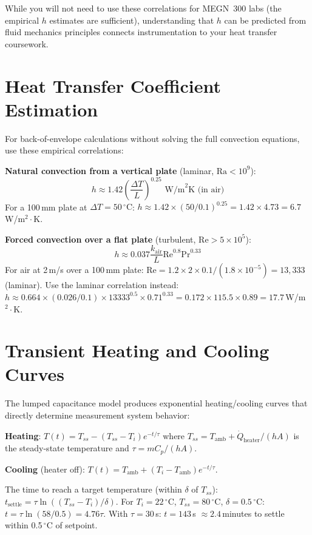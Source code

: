 \documentclass[11pt,letterpaper,twoside,openany]{book}
\newcommand{\degC}{\ensuremath{{}^{\circ}\text{C}}}
\begin{document}
While you will not need to use these correlations for MEGN~300 labs (the empirical $h$ estimates are sufficient), understanding that $h$ can be predicted from fluid mechanics principles connects instrumentation to your heat transfer coursework.
\section{Heat Transfer Coefficient Estimation}
For back-of-envelope calculations without solving the full convection equations, use these empirical correlations:

\textbf{Natural convection from a vertical plate} (laminar, $\text{Ra} < 10^9$):
\begin{equation}
h \approx 1.42 \left(\frac{\Delta T}{L}\right)^{0.25} \text{ W/m}^2\text{K (in air)}
\end{equation}
For a 100\,mm plate at $\Delta T = 50$\,\degC{}: $h \approx 1.42 \times (50/0.1)^{0.25} = 1.42 \times 4.73 = 6.7$\,W/m$^2\cdot$K.

\textbf{Forced convection over a flat plate} (turbulent, $\text{Re} > 5 \times 10^5$):
\begin{equation}
h \approx 0.037 \frac{k_{\text{air}}}{L} \text{Re}^{0.8} \text{Pr}^{0.33}
\end{equation}
For air at 2\,m/s over a 100\,mm plate: $\text{Re} = 1.2 \times 2 \times 0.1 / (1.8 \times 10^{-5}) = 13{,}333$ (laminar). Use the laminar correlation instead: $h \approx 0.664 \times (0.026/0.1) \times 13333^{0.5} \times 0.71^{0.33} = 0.172 \times 115.5 \times 0.89 = 17.7$\,W/m$^2\cdot$K.

\section{Transient Heating and Cooling Curves}
The lumped capacitance model produces exponential heating/cooling curves that directly determine measurement system behavior:

\textbf{Heating}: $T(t) = T_{ss} - (T_{ss} - T_i)e^{-t/\tau}$ where $T_{ss} = T_{\text{amb}} + \dot{Q}_{\text{heater}}/(hA)$ is the steady-state temperature and $\tau = mC_p/(hA)$.

\textbf{Cooling} (heater off): $T(t) = T_{\text{amb}} + (T_i - T_{\text{amb}})e^{-t/\tau}$.

The time to reach a target temperature (within $\delta$ of $T_{ss}$): $t_{\text{settle}} = \tau \ln((T_{ss} - T_i)/\delta)$. For $T_i = 22$\,\degC{}, $T_{ss} = 80$\,\degC{}, $\delta = 0.5$\,\degC{}: $t = \tau \ln(58/0.5) = 4.76\tau$. With $\tau = 30$\,s: $t = 143$\,s $\approx 2.4$\,minutes to settle within 0.5\,\degC{} of setpoint.
\end{document}
